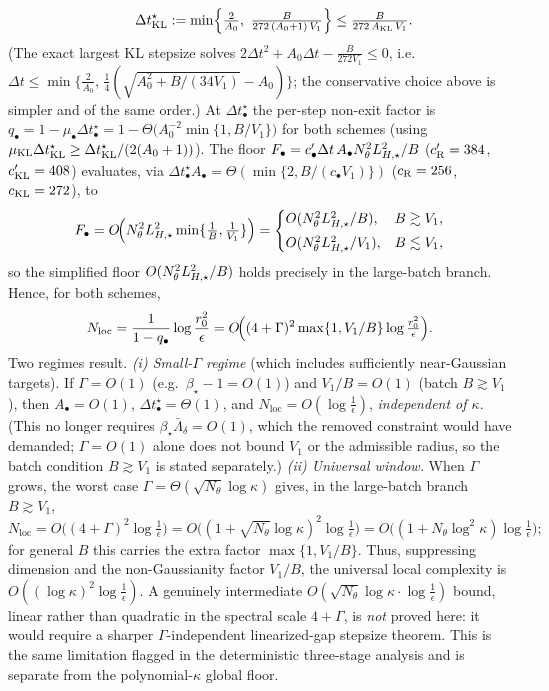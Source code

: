 \begin{remark}
\[    \qquad
    \Delta t_{\KL}^\star:=\min\Bigl\{\tfrac2{A_0},\ \tfrac{B}{272\,(A_0+1)\,V_1}\Bigr\}\leq\tfrac{B}{272\,A_{\KL}\,V_1}.
\]
(The exact largest KL stepsize solves $2\Delta t^2+A_0\Delta t-\tfrac{B}{272V_1}\leq0$, i.e.\
$\Delta t\leq\min\{\tfrac2{A_0},\,\tfrac14(\sqrt{A_0^2+B/(34V_1)}-A_0)\}$; the conservative choice above is
simpler and of the same order.)
At $\Delta t_\bullet^\star$ the per-step non-exit factor is
$q_\bullet=1-\mu_\bullet\Delta t_\bullet^\star=1-\Theta\!\bigl(A_0^{-2}\min\{1,B/V_1\}\bigr)$ for both
schemes (using $\mu_{\mathrm{KL}}\Delta t_{\mathrm{KL}}^\star\geq\Delta t_{\mathrm{KL}}^\star/(2(A_0+1))$). The floor
$F_\bullet=c'_\bullet\Delta t\,A_\bullet N_\theta^2L_{H,\star}^2/B$ ($c'_{\mathrm{R}}=384$, $c'_{\mathrm{KL}}=408$)
evaluates, via $\Delta t_\bullet^\star A_\bullet=\Theta(\min\{2,B/(c_\bullet V_1)\})$ ($c_{\mathrm{R}}=256$,
$c_{\mathrm{KL}}=272$), to
\[
    F_\bullet=O\!\Bigl(N_\theta^2L_{H,\star}^2\min\{\tfrac1B,\tfrac1{V_1}\}\Bigr)
    =\begin{cases}O(N_\theta^2L_{H,\star}^2/B), & B\gtrsim V_1,\\[1mm] O(N_\theta^2L_{H,\star}^2/V_1), & B\lesssim V_1,\end{cases}
\]
so the simplified floor $O(N_\theta^2L_{H,\star}^2/B)$ holds precisely in the large-batch branch. Hence, for
both schemes,
\[
    N_{\mathrm{loc}}=\frac1{1-q_\bullet}\log\frac{r_0^2}\epsilon
    =O\!\Bigl((4+\Gamma)^2\max\{1,V_1/B\}\log\tfrac{r_0^2}\epsilon\Bigr).
\]
Two regimes result.
\emph{(i) Small-$\Gamma$ regime} (which includes sufficiently near-Gaussian targets). If $\Gamma=O(1)$
(e.g.\ $\beta_\star-1=O(1)$) and $V_1/B=O(1)$ (batch $B\gtrsim V_1$), then $A_\bullet=O(1)$,
$\Delta t_\bullet^\star=\Theta(1)$, and $N_{\mathrm{loc}}=O(\log\tfrac1\epsilon)$, \emph{independent of
$\kappa$}. (This no longer requires
$\beta_\star\bar\Lambda_\delta=O(1)$, which the removed constraint would have demanded; $\Gamma=O(1)$
alone does not bound $V_1$ or the admissible radius, so the batch condition $B\gtrsim V_1$ is stated
separately.)
\emph{(ii) Universal window.} When $\Gamma$ grows, the worst case
$\Gamma=\Theta(\sqrt{N_\theta}\log\kappa)$ gives, in the large-batch branch $B\gtrsim V_1$,
\[
    N_{\mathrm{loc}}=O\bigl((4+\Gamma)^2\log\tfrac1\epsilon\bigr)
    =O\bigl((1+\sqrt{N_\theta}\log\kappa)^2\log\tfrac1\epsilon\bigr)
    =O\bigl((1+N_\theta\log^2\kappa)\log\tfrac1\epsilon\bigr);
\]
for general $B$ this carries the extra factor $\max\{1,V_1/B\}$.
Thus, suppressing dimension and the non-Gaussianity factor $V_1/B$, the universal local complexity is
$O((\log\kappa)^2\log\tfrac1\epsilon)$. A genuinely intermediate
$O(\sqrt{N_\theta}\log\kappa\cdot\log\tfrac1\epsilon)$ bound, linear rather than quadratic in the
spectral scale $4+\Gamma$, is \emph{not} proved here: it
would require a sharper $\Gamma$-independent linearized-gap stepsize theorem. This is the same
limitation flagged in the deterministic three-stage analysis and is separate from the
polynomial-$\kappa$ global floor.
\end{remark}

